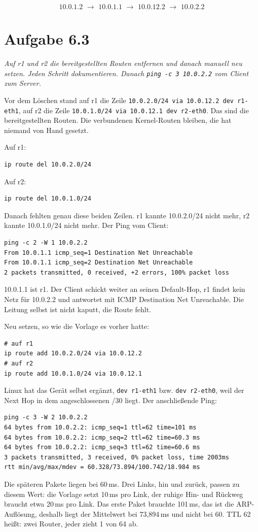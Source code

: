 \documentclass[a4paper,11pt]{article}
\newif\ifexplain
\newcommand{\aufgabe}[1]{\section*{Aufgabe #1}}
\newcommand{\angabe}[1]{{\raggedright\textit{#1}\par}\smallskip}
\newcommand{\explain}[1]{\ifexplain\begin{erklbox}#1\end{erklbox}\fi}
\begin{document}
\explain{Linux legt die verbundenen Routen selbst an, sobald \texttt{ip addr add} eine Adresse setzt. Die beiden Zeilen mit \texttt{via} kommen extra aus \texttt{start\_lab.py}. Eine Default-Route auf dem Client ist nötig, weil 10.0.2.2 außerhalb von 10.0.1.0/24 liegt. r1 braucht keine Default-Route: er kennt das Servernetz explizit.}
\[\boxed{\text{10.0.1.2 $\to$ 10.0.1.1 $\to$ 10.0.12.2 $\to$ 10.0.2.2}}\]

\aufgabe{6.3}
\angabe{Auf r1 und r2 die bereitgestellten Routen entfernen und danach manuell neu setzen. Jeden Schritt dokumentieren. Danach \texttt{ping -c 3 10.0.2.2} vom Client zum Server.}
Vor dem Löschen stand auf r1 die Zeile \texttt{10.0.2.0/24 via 10.0.12.2 dev r1-eth1}, auf r2 die Zeile \texttt{10.0.1.0/24 via 10.0.12.1 dev r2-eth0}. Das sind die bereitgestellten Routen. Die verbundenen Kernel-Routen bleiben, die hat niemand von Hand gesetzt.

Auf r1:
\begin{lstlisting}
ip route del 10.0.2.0/24
\end{lstlisting}
Auf r2:
\begin{lstlisting}
ip route del 10.0.1.0/24
\end{lstlisting}
Danach fehlten genau diese beiden Zeilen. r1 kannte 10.0.2.0/24 nicht mehr, r2 kannte 10.0.1.0/24 nicht mehr. Der Ping vom Client:
\begin{lstlisting}
ping -c 2 -W 1 10.0.2.2
From 10.0.1.1 icmp_seq=1 Destination Net Unreachable
From 10.0.1.1 icmp_seq=2 Destination Net Unreachable
2 packets transmitted, 0 received, +2 errors, 100% packet loss
\end{lstlisting}
10.0.1.1 ist r1. Der Client schickt weiter an seinen Default-Hop, r1 findet kein Netz für 10.0.2.2 und antwortet mit ICMP Destination Net Unreachable. Die Leitung selbst ist nicht kaputt, die Route fehlt.

Neu setzen, so wie die Vorlage es vorher hatte:
\begin{lstlisting}
# auf r1
ip route add 10.0.2.0/24 via 10.0.12.2
# auf r2
ip route add 10.0.1.0/24 via 10.0.12.1
\end{lstlisting}
Linux hat das Gerät selbst ergänzt, \texttt{dev r1-eth1} bzw. \texttt{dev r2-eth0}, weil der Next Hop in dem angeschlossenen /30 liegt. Der anschließende Ping:
\begin{lstlisting}
ping -c 3 -W 2 10.0.2.2
64 bytes from 10.0.2.2: icmp_seq=1 ttl=62 time=101 ms
64 bytes from 10.0.2.2: icmp_seq=2 ttl=62 time=60.3 ms
64 bytes from 10.0.2.2: icmp_seq=3 ttl=62 time=60.6 ms
3 packets transmitted, 3 received, 0% packet loss, time 2003ms
rtt min/avg/max/mdev = 60.328/73.894/100.742/18.984 ms
\end{lstlisting}
Die späteren Pakete liegen bei 60\,ms. Drei Links, hin und zurück, passen zu diesem Wert: die Vorlage setzt 10\,ms pro Link, der ruhige Hin- und Rückweg braucht etwa 20\,ms pro Link. Das erste Paket brauchte 101\,ms, das ist die ARP-Auflösung, deshalb liegt der Mittelwert bei 73,894\,ms und nicht bei 60. TTL 62 heißt: zwei Router, jeder zieht 1 von 64 ab.
\end{document}
